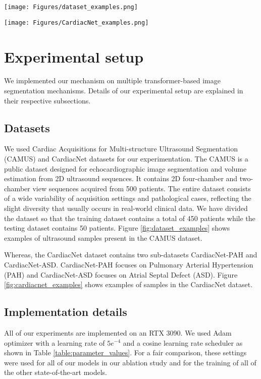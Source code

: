 \documentclass[preprint,12pt]{elsarticle}
\begin{document}
\begin{figure*}[!ht]
\centering
\texttt{[image: Figures/dataset\_examples.png]}
\caption{Sample inputs from CAMUS dataset.}
\label{fig:dataset_examples}
\end{figure*}

\begin{figure*}[!ht]
\centering
\texttt{[image: Figures/CardiacNet\_examples.png]}
\caption{Sample inputs from CardiacNet dataset.}
\label{fig:cardiacnet_examples}
\end{figure*}

\section{Experimental setup}
\label{experimental}
We implemented our mechanism on multiple transformer-based image segmentation mechanisms. Details of our experimental setup are explained in their respective subsections.

\subsection{Datasets}
We used Cardiac Acquisitions for Multi-structure Ultrasound Segmentation (CAMUS) \cite{camus} and CardiacNet \cite{cardiacnet} datasets for our experimentation. The CAMUS is a public dataset designed for echocardiographic image segmentation and volume estimation from 2D ultrasound sequences. It contains 2D four-chamber and two-chamber view sequences acquired from 500 patients. The entire dataset consists of a wide variability of acquisition settings and pathological cases, reflecting the slight diversity that usually occurs in real-world clinical data. We have divided the dataset so that the training dataset contains a total of 450 patients while the testing dataset contains 50 patients. Figure \ref{fig:dataset_examples} shows examples of ultrasound samples present in the CAMUS dataset.



Whereas, the CardiacNet dataset contains two sub-datasets CardiacNet-PAH and CardiacNet-ASD. CardiacNet-PAH focuses on Pulmonary Arterial Hypertension (PAH) and CardiacNet-ASD focuses on Atrial Septal Defect (ASD). Figure \ref{fig:cardiacnet_examples} shows examples of samples in the CardiacNet dataset.



\subsection{Implementation details}
All of our experiments are implemented on an RTX 3090. We used Adam optimizer with a learning rate of $5e^{-4}$ and a cosine learning rate scheduler as shown in Table \ref{table:parameter_values}. For a fair comparison, these settings were used for all of our models in our ablation study and for the training of all of the other state-of-the-art models.
\end{document}
